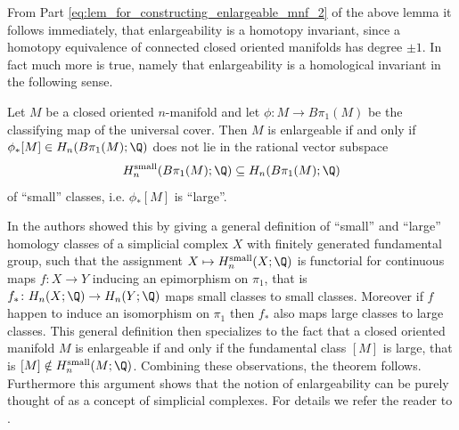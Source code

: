 From Part \ref{eq:lem_for_constructing_enlargeable_mnf_2} of the above lemma it follows immediately, that enlargeability is a homotopy invariant, since a homotopy equivalence of connected closed oriented manifolds has degree $\pm 1$. In fact much more is true, namely that enlargeability is a homological invariant in the following sense. 

\begin{theorem*}
    Let $M$ be a closed oriented $n$-manifold and let $\phi \colon M \to B\pi_1(M)$ be the classifying map of the universal cover. Then $M$ is enlargeable if and only if $\phi_\ast [M] \in H_n(B\pi_1(M);\Q)$ does not lie in the rational vector subspace 
    \[
    H_n^\mathrm{small}(B\pi_1(M);\Q) \subseteq H_n(B\pi_1(M);\Q)
    \]
    of ``small'' classes, i.e. $\phi_\ast [M]$ is ``large''.
\end{theorem*}

 In \cite{BrunnbauerHanke} the authors showed this by giving a general definition of ``small'' and ``large'' homology classes of a simplicial complex $X$ with finitely generated fundamental group, such that the assignment $X \mapsto H_n^\mathrm{small}(X;\Q)$ is functorial for continuous maps $f \colon X \to Y$ inducing an epimorphism on $\pi_1$, that is $f_\ast \colon H_n(X;\Q) \to H_n(Y;\Q)$ maps small classes to small classes. Moreover if $f$ happen to induce an isomorphism on $\pi_1$ then $f_\ast$ also maps large classes to large classes. This general definition then specializes to the fact that a closed oriented manifold $M$ is enlargeable if and only if the fundamental class $[M]$ is large, that is $[M] \notin H_n^\mathrm{small}(M;\Q)$. Combining these observations, the theorem follows. Furthermore this argument shows that the notion of enlargeability can be purely thought of as a concept of simplicial complexes. For details we refer the reader to \cite{BrunnbauerHanke}.




